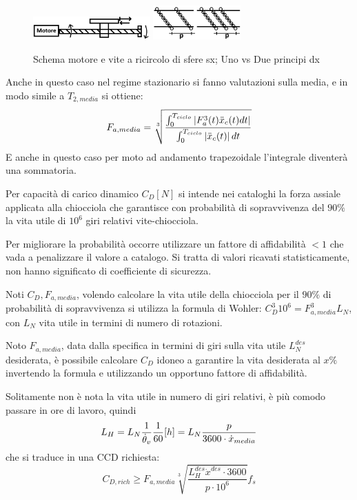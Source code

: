 \begin{figure}[h]
    \centering
    \includegraphics[width=0.4\textwidth]{Immagini/mot_vite_ricircolo.png}
    \includegraphics[width=0.3\textwidth]{Immagini/principi_viti_ricircolo.png}
    \caption{Schema motore e vite a ricircolo di sfere sx; Uno vs Due principi dx}
\end{figure}

Anche in questo caso nel regime stazionario si fanno valutazioni sulla media, e in modo simile a \( T_{2,media} \) si ottiene:
\[ F_{a, media} = \sqrt[3]{\frac{\int^{T_{ciclo}}_0 \left|F_a^3(t)\Ddot{x}_c(t)dt\right|}{\int^{T_{ciclo}}_0 \left|\Ddot{x}_c(t)\right|dt}} \]
E anche in questo caso per moto ad andamento trapezoidale l'integrale diventerà una sommatoria.

Per capacità di carico dinamico \( C_D [N] \) si intende nei cataloghi la forza assiale applicata alla  chiocciola che garantisce con probabilità di sopravvivenza del \(90\%\) la vita utile di \(10^6\) giri relativi vite-chiocciola.

Per migliorare la probabilità occorre utilizzare un fattore di affidabilità \(<1\) che vada a penalizzare il valore a catalogo. Si tratta di valori ricavati statisticamente, non hanno significato di coefficiente di sicurezza.

Noti \(C_D, F_{a, media}\), volendo calcolare la vita utile della chiocciola per il \(90\%\) di probabilità di sopravvivenza si utilizza la formula di Wohler: \( C_D^3 10^6 = F_{a,media}^3 L_N \), con \(L_N\) vita utile in termini di numero di rotazioni.

Noto \(F_{a,media}\), data dalla specifica in termini di giri sulla vita utile \(L_N^{des}\) desiderata, è possibile calcolare \(C_D\) idoneo a garantire la vita desiderata al \(x\%\) invertendo la formula e utilizzando un opportuno fattore di affidabilità.

Solitamente non è nota la vita utile in numero di giri relativi, è più comodo passare in ore di lavoro, quindi 
\[ L_H = L_N \frac{1}{\dot{\theta}_v} \frac{1}{60} [h] = L_N \frac{p}{3600 \cdot \dot{x}_{media}} \]
che si traduce in una CCD richiesta: 
\[ C_{D,rich} \geqslant F_{a,media} \sqrt[3]{\frac{L_H^{des}\dot{x}^{des} \cdot 3600}{p \cdot 10^6}} f_s \]

